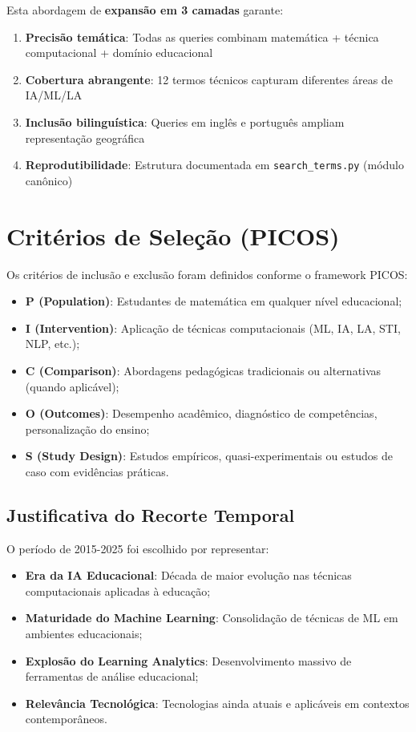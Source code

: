 Esta abordagem de \textbf{expansão em 3 camadas} garante:
\begin{enumerate}
    \item \textbf{Precisão temática}: Todas as queries combinam matemática + técnica computacional + domínio educacional
    \item \textbf{Cobertura abrangente}: 12 termos técnicos capturam diferentes áreas de IA/ML/LA
    \item \textbf{Inclusão bilinguística}: Queries em inglês e português ampliam representação geográfica
    \item \textbf{Reprodutibilidade}: Estrutura documentada em \texttt{search\_terms.py} (módulo canônico)
\end{enumerate}

\section{Critérios de Seleção (PICOS)}

Os critérios de inclusão e exclusão foram definidos conforme o framework PICOS:

\begin{itemize}
    \item \textbf{P (Population)}: Estudantes de matemática em qualquer nível educacional;
    \item \textbf{I (Intervention)}: Aplicação de técnicas computacionais (ML, IA, LA, STI, NLP, etc.);
    \item \textbf{C (Comparison)}: Abordagens pedagógicas tradicionais ou alternativas (quando aplicável);
    \item \textbf{O (Outcomes)}: Desempenho acadêmico, diagnóstico de competências, personalização do ensino;
    \item \textbf{S (Study Design)}: Estudos empíricos, quasi-experimentais ou estudos de caso com evidências práticas.
\end{itemize}

\subsection{Justificativa do Recorte Temporal}

O período de 2015-2025 foi escolhido por representar:

\begin{itemize}
    \item \textbf{Era da IA Educacional}: Década de maior evolução nas técnicas computacionais aplicadas à educação;
    \item \textbf{Maturidade do Machine Learning}: Consolidação de técnicas de ML em ambientes educacionais;
    \item \textbf{Explosão do Learning Analytics}: Desenvolvimento massivo de ferramentas de análise educacional;
    \item \textbf{Relevância Tecnológica}: Tecnologias ainda atuais e aplicáveis em contextos contemporâneos.
\end{itemize}

